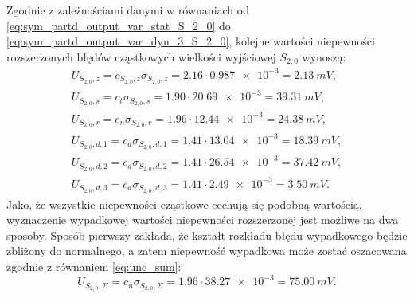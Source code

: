Zgodnie z zależnościami danymi w równaniach od \eqref{eq:sym_partd_output_var_stat_S_2_0} do \eqref{eq:sym_partd_output_var_dyn_3_S_2_0}, kolejne wartości niepewności rozszerzonych błędów cząstkowych wielkości wyjściowej $S_{2,0}$ wynoszą:
\begin{gather}
U_{S_{2,0},z} = c_{S_{2,0},z} \sigma_{S_{2,0},z} = 2.16 \cdot \num{0.987e-3} = \qty{2.13}{mV} \label{eq:sym_partd_output_unc_roun_S_2_0},\\
U_{S_{2,0},s} = c_{t} \sigma_{S_{2,0},s} = 1.90 \cdot \num{20.69e-3} = \qty{39.31}{mV} \label{eq:sym_partd_output_unc_stat_S_2_0}, \\
U_{S_{2,0},r} = c_{n} \sigma_{S_{2,0},r} = 1.96 \cdot \num{12.44e-3} = \qty{24.38}{mV} \label{eq:sym_partd_output_unc_rand_S_2_0}, \\
U_{S_{2,0},d,1} = c_{d} \sigma_{S_{2,0},d,1} = 1.41 \cdot \num{13.04e-3} = \qty{18.39}{mV} \label{eq:sym_partd_output_unc_dyn_1_S_2_0}, \\
U_{S_{2,0},d,2} = c_{d} \sigma_{S_{2,0},d,2} = 1.41 \cdot \num{26.54e-3} = \qty{37.42}{mV} \label{eq:sym_partd_output_unc_dyn_2_S_2_0}, \\
U_{S_{2,0},d,3} = c_{d} \sigma_{S_{2,0},d,3} = 1.41 \cdot \num{2.49e-3} = \qty{3.50}{mV} \label{eq:sym_partd_output_unc_dyn_3_S_2_0}.
\end{gather}
Jako, że wszystkie niepewności cząstkowe cechują się podobną wartością, wyznaczenie wypadkowej wartości niepewności rozszerzonej jest możliwe na dwa sposoby. Sposób pierwszy zakłada, że kształt rozkładu błędu wypadkowego będzie zbliżony do normalnego, a zatem niepewność wypadkowa może zostać oszacowana zgodnie z równaniem \eqref{eq:unc_sum}:
\begin{equation}
U_{S_{2,0},\Sigma} = c_{n} \sigma_{S_{2,0},\Sigma} = 1.96 \cdot \num{38.27e-3} = \qty{75.00}{mV} \label{eq:sym_partd_output_unc_total_a_S_2_0}.
\end{equation}


